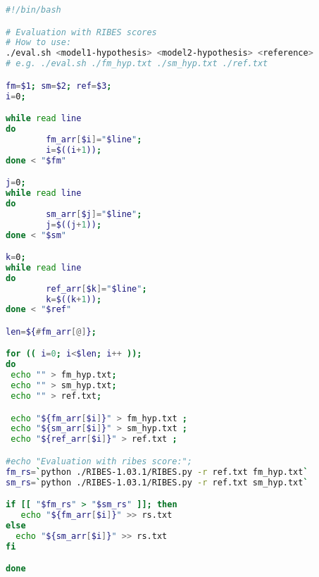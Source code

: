 \documentclass{article}
\begin{document}
\begin{lstlisting}[language=bash,caption={bash version}]
#!/bin/bash

# Evaluation with RIBES scores
# How to use: 
./eval.sh <model1-hypothesis> <model2-hypothesis> <reference>
# e.g. ./eval.sh ./fm_hyp.txt ./sm_hyp.txt ./ref.txt

fm=$1; sm=$2; ref=$3;
i=0;

while read line 
do
        fm_arr[$i]="$line";
        i=$((i+1));
done < "$fm"

j=0;
while read line 
do
        sm_arr[$j]="$line";
        j=$((j+1));
done < "$sm"

k=0;
while read line 
do
        ref_arr[$k]="$line";
        k=$((k+1));
done < "$ref"

len=${#fm_arr[@]};

for (( i=0; i<$len; i++ )); 
do 
 echo "" > fm_hyp.txt;
 echo "" > sm_hyp.txt;
 echo "" > ref.txt;

 echo "${fm_arr[$i]}" > fm_hyp.txt ; 
 echo "${sm_arr[$i]}" > sm_hyp.txt ; 
 echo "${ref_arr[$i]}" > ref.txt ; 

#echo "Evaluation with ribes score:";
fm_rs=`python ./RIBES-1.03.1/RIBES.py -r ref.txt fm_hyp.txt`
sm_rs=`python ./RIBES-1.03.1/RIBES.py -r ref.txt sm_hyp.txt`

if [[ "$fm_rs" > "$sm_rs" ]]; then
   echo "${fm_arr[$i]}" >> rs.txt
else
  echo "${sm_arr[$i]}" >> rs.txt	
fi 

done
\end{lstlisting}
\end{document}
